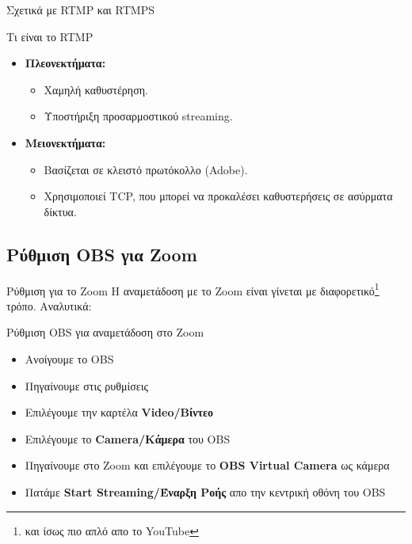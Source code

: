 \documentclass[aspectratio=169]{beamer}
\begin{document}
\begin{frame}[allowframebreaks]{Σχετικά με RTMP και RTMPS}
\begin{exampleblock}{Τι είναι το RTMP}
\begin{itemize}
\begin{itemize}
          \end{itemize}
      \item \textbf{Πλεονεκτήματα:}
          \begin{itemize}
              \item Χαμηλή καθυστέρηση.
              \item Υποστήριξη προσαρμοστικού streaming.
          \end{itemize}
      \item \textbf{Μειονεκτήματα:}
          \begin{itemize}
              \item Βασίζεται σε κλειστό πρωτόκολλο (Adobe).
              \item Χρησιμοποιεί TCP, που μπορεί να προκαλέσει καθυστερήσεις σε ασύρματα δίκτυα.
          \end{itemize}
  \end{itemize}
  \end{exampleblock}
\end{frame}
\subsection{Ρύθμιση OBS για Zoom}
\begin{frame}{Ρύθμιση  για το Zoom}
  Η αναμετάδοση με το Zoom είναι γίνεται με διαφορετικό\footnote{και ίσως πιο απλό απο το YouTube} τρόπο. Αναλυτικά:
  \begin{block}
    {Ρύθμιση OBS για αναμετάδοση στο Zoom}
    \begin{itemize}
      \item Ανοίγουμε το OBS
      \item Πηγαίνουμε στις ρυθμίσεις
      \item Επιλέγουμε την καρτέλα \textbf{Video/Βίντεο}
      \item Επιλέγουμε το \textbf{Camera/Κάμερα} του OBS
      \item Πηγαίνουμε στο Zoom και επιλέγουμε το \textbf{OBS Virtual Camera} ως κάμερα
      \item Πατάμε \textbf{Start Streaming/Έναρξη Ροής} απο την κεντρική οθόνη του OBS
    \end{itemize}
  \end{block}
\end{frame}
\end{document}
